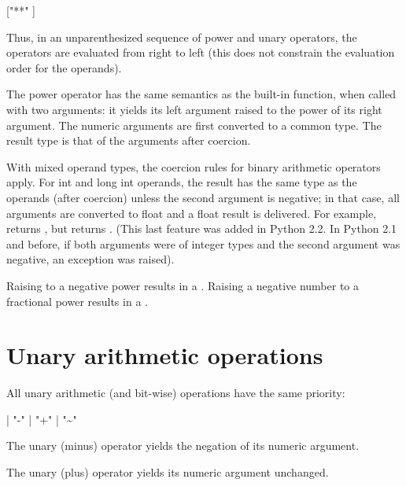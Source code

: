 \begin{productionlist}
             { ["**" ]}
\end{productionlist}

Thus, in an unparenthesized sequence of power and unary operators, the
operators are evaluated from right to left (this does not constrain
the evaluation order for the operands).

The power operator has the same semantics as the built-in
 function, when called with two arguments: it yields
its left argument raised to the power of its right argument.  The
numeric arguments are first converted to a common type.  The result
type is that of the arguments after coercion.

With mixed operand types, the coercion rules for binary arithmetic
operators apply. For int and long int operands, the result has the
same type as the operands (after coercion) unless the second argument
is negative; in that case, all arguments are converted to float and a
float result is delivered. For example,  returns ,
but  returns . (This last feature was added in
Python 2.2. In Python 2.1 and before, if both arguments were of integer
types and the second argument was negative, an exception was raised).

Raising  to a negative power results in a
.  Raising a negative number to a
fractional power results in a .


\section{Unary arithmetic operations \label{unary}}

All unary arithmetic (and bit-wise) operations have the same priority:

\begin{productionlist}
             { | "-" 
              | "+"  | "{\~}" }
\end{productionlist}

The unary \code{-} (minus) operator yields the negation of its
numeric argument.

The unary \code{+} (plus) operator yields its numeric argument
unchanged.

